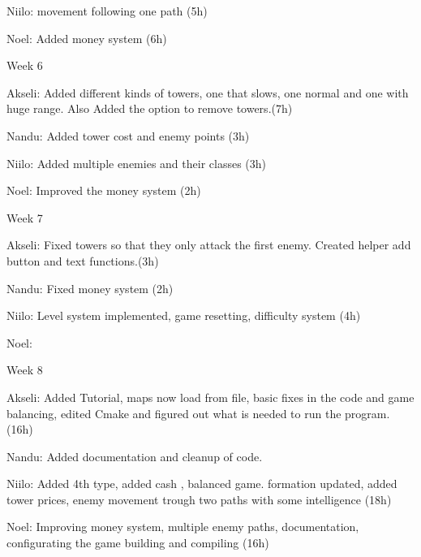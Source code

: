 Niilo\+:  movement following one path (5h)

Noel\+: Added money system (6h)

Week 6

Akseli\+: Added different kinds of towers, one that slows, one normal and one with huge range. Also Added the option to remove towers.(7h)

Nandu\+: Added tower cost and enemy points (3h)

Niilo\+: Added multiple enemies and their classes (3h)

Noel\+: Improved the money system (2h)

Week 7

Akseli\+: Fixed towers so that they only attack the first enemy. Created helper add button and text functions.(3h)

Nandu\+: Fixed money system (2h)

Niilo\+: Level system implemented, game resetting, difficulty system (4h)

Noel\+:

Week 8

Akseli\+: Added Tutorial, maps now load from file, basic fixes in the code and game balancing, edited Cmake and figured out what is needed to run the program. (16h)

Nandu\+: Added documentation and cleanup of code.

Niilo\+: Added 4th  type, added cash , balanced game.  formation updated, added tower prices, enemy movement trough two paths with some intelligence (18h)

Noel\+: Improving money system, multiple enemy paths, documentation, configurating the game building and compiling (16h) 